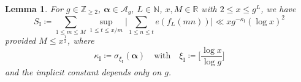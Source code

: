 \documentclass[hidelinks]{amsart}
\numberwithin{equation}{section}
\theoremstyle{plain}
\newtheorem{lemma}{Lemma}
\theoremstyle{definition}
\begin{document}
\begin{lemma}
\label{lem:TypeI}
For $g\in\mathbb{Z}_{\ge2}$, $\bm{\alpha}\in\mathscr{A}_{g}$,
$L\in\mathbb{N}$, $x,M\in\mathbb{R}$ with $2\le x\le g^{L}$, we have
\[
S_{\mathrm{I}}
\coloneqq
\sum_{1\le m\le M}
\sup_{1\le t\le x/m}
\biggl|
\sum_{1\le n\le t}
e(f_{L}(mn))
\biggr|
\ll
xg^{-\kappa_{\mathrm{I}}}(\log x)^{2}
\]
provided $M\le x^{\frac{1}{2}}$, where
\begin{equation}
\label{lem:TypeI:def:kappa}
\kappa_{\mathrm{I}}
\coloneqq
\sigma_{\xi_{\mathrm{I}}}(\bm{\alpha})
\quad\text{with}\quad
\xi_{\mathrm{I}}
\coloneqq
\biggl[\frac{\log x}{\log g}\biggr]
\end{equation}
and the implicit constant depends only on $g$.
\end{lemma}
\end{document}
